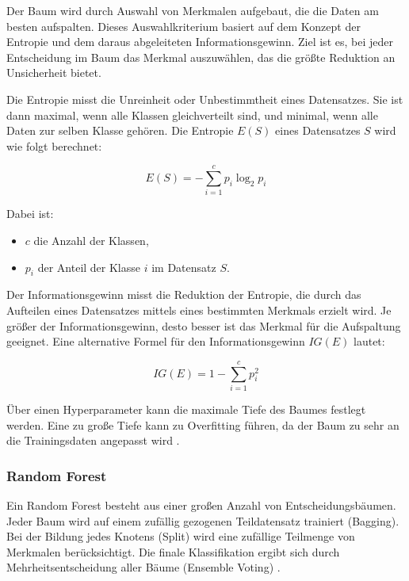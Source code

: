 Der Baum wird durch Auswahl von Merkmalen aufgebaut, die die Daten am besten aufspalten. 
Dieses Auswahlkriterium basiert auf dem Konzept der Entropie und dem daraus abgeleiteten Informationsgewinn. 
Ziel ist es, bei jeder Entscheidung im Baum das Merkmal auszuwählen, das die größte Reduktion an Unsicherheit bietet.

Die Entropie misst die Unreinheit oder Unbestimmtheit eines Datensatzes. Sie ist dann maximal, 
wenn alle Klassen gleichverteilt sind, und minimal, wenn alle Daten zur selben Klasse gehören. 
Die Entropie \( E(S) \) eines Datensatzes \( S \) wird wie folgt berechnet:

\begin{equation}
    E(S) = - \sum_{i=1}^{c} p_i \log_2 p_i
\end{equation}

Dabei ist:
\begin{itemize}
  \item \( c \) die Anzahl der Klassen,
  \item \( p_i \) der Anteil der Klasse \( i \) im Datensatz \( S \).
\end{itemize}

Der Informationsgewinn misst die Reduktion der Entropie, die durch das Aufteilen eines Datensatzes mittels eines bestimmten Merkmals erzielt wird. Je größer der Informationsgewinn, desto besser ist das Merkmal für die Aufspaltung geeignet. Eine alternative Formel für den Informationsgewinn $IG(E)$ lautet:

\begin{equation}
    IG(E) = 1 - \sum_{i=1}^{c} p_i^2
\end{equation}

Über einen Hyperparameter kann die maximale Tiefe des Baumes festlegt werden. 
Eine zu große Tiefe kann zu Overfitting führen, da der Baum zu sehr an die Trainingsdaten angepasst wird \cite{aslam2022}.


\subsubsection{Random Forest}

Ein Random Forest besteht aus einer großen Anzahl von Entscheidungsbäumen. 
Jeder Baum wird auf einem zufällig gezogenen Teildatensatz trainiert (Bagging). 
Bei der Bildung jedes Knotens (Split) wird eine zufällige Teilmenge von Merkmalen berücksichtigt. 
Die finale Klassifikation ergibt sich durch Mehrheitsentscheidung aller Bäume (Ensemble Voting) \cite{elchami2025}.

